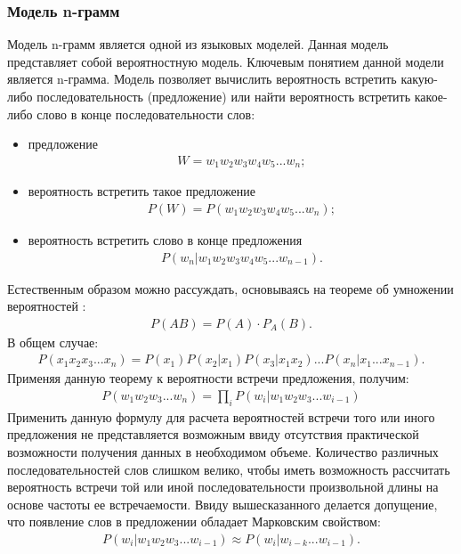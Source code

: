 \subsubsection{Модель n-грамм}
Модель n-грамм является одной из языковых моделей. Данная модель представляет собой вероятностную модель. Ключевым понятием данной модели является n-грамма. Модель позволяет вычислить вероятность встретить какую-либо последовательность (предложение) или найти вероятность встретить какое-либо слово в конце последовательности слов:
\begin{itemize}
	\item
	предложение
	\begin{align}
		W = w_1w_2w_3w_4w_5...w_n;
	\end{align}
	\item
	вероятность встретить такое предложение
	\begin{align}
		P(W) = P(w_1w_2w_3w_4w_5...w_n);
	\end{align}
	\item
	вероятность встретить слово в конце предложения
	\begin{align}
		P(w_n|w_1w_2w_3w_4w_5...w_{n-1}).
	\end{align}
\end{itemize}
Естественным образом можно рассуждать, основываясь на теореме об умножении вероятностей \cite{gmurman}:
\begin{align}
	P(AB) = P(A) \cdot P_A(B).
\end{align}
В общем случае:
\begin{align}
	P(x_1x_2x_3...x_n) = P(x_1)P(x_2|x_1)P(x_3|x_1x_2)...P(x_n|x_1...x_{n-1}).
\end{align}
Применяя данную теорему к вероятности встречи предложения, получим:
\begin{align}
	P(w_1w_2w_3...w_n) = \prod_{i}P(w_i|w_1w_2w_3...w_{i-1})
\end{align}
Применить данную формулу для расчета вероятностей встречи того или иного предложения не представляется возможным ввиду отсутствия практической возможности получения данных в необходимом объеме. Количество различных последовательностей слов слишком велико, чтобы иметь возможность рассчитать вероятность встречи той или иной последовательности произвольной длины на основе частоты ее встречаемости. Ввиду вышесказанного делается допущение, что появление слов в предложении обладает Марковским свойством:
\begin{align}
	P(w_i|w_1w_2w_3...w_{i-1}) \approx P(w_i|w_{i-k}...w_{i-1}).
\end{align}
